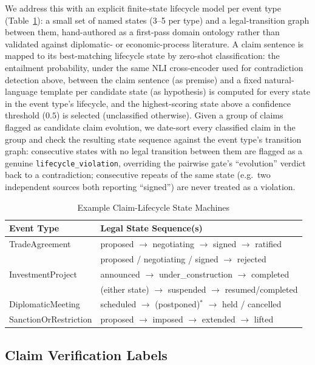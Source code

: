 \documentclass[conference]{IEEEtran}
\begin{document}
We address this with an explicit finite-state lifecycle model per event
type (Table~\ref{tab:lifecycles}): a small set of named states (3--5 per
type) and a legal-transition graph between them, hand-authored as a
first-pass domain ontology rather than validated against diplomatic- or
economic-process literature. A claim sentence is mapped to its
best-matching lifecycle state by zero-shot classification: the entailment
probability, under the same NLI cross-encoder used for contradiction
detection above, between the claim sentence (as premise) and a fixed
natural-language template per candidate state (as hypothesis) is computed
for every state in the event type's lifecycle, and
the highest-scoring state above a confidence threshold ($0.5$) is selected
(unclassified otherwise). Given a group of claims flagged as candidate claim
evolution, we date-sort every classified claim in the group and check the
resulting state sequence against the event type's transition graph:
consecutive states with no legal transition between them are flagged as a
genuine \texttt{lifecycle\_violation}, overriding the pairwise gate's
``evolution'' verdict back to a contradiction; consecutive repeats of the
same state (e.g.\ two independent sources both reporting ``signed'') are
never treated as a violation.

\begin{table}[htbp]
\caption{Example Claim-Lifecycle State Machines}
\label{tab:lifecycles}
\centering
\small
\begin{tabular}{ll}
\toprule
\textbf{Event Type} & \textbf{Legal State Sequence(s)} \\
\midrule
TradeAgreement & proposed $\to$ negotiating $\to$ signed $\to$ ratified \\
               & proposed / negotiating / signed $\to$ rejected \\
InvestmentProject & announced $\to$ under\_construction $\to$ completed \\
                   & (either state) $\to$ suspended $\to$ resumed/completed \\
DiplomaticMeeting & scheduled $\to$ (postponed)$^{*}$ $\to$ held / cancelled \\
SanctionOrRestriction & proposed $\to$ imposed $\to$ extended $\to$ lifted \\
\bottomrule
\end{tabular}
\end{table}

\subsection{Claim Verification Labels}
\end{document}
